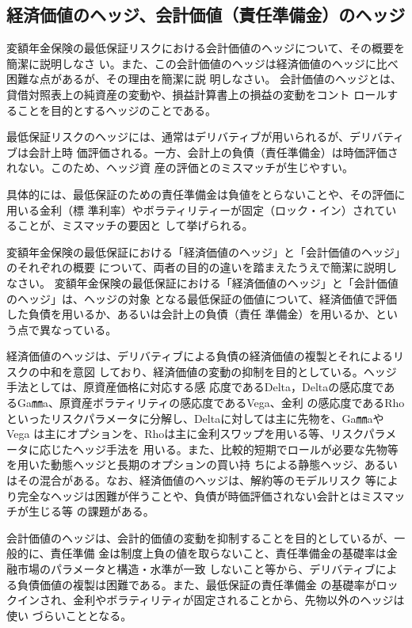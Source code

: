 \documentclass[report,gutter=10mm,fore-edge=10mm,uplatex,dvipdfmx]{jlreq}
\begin{document}
{\subsection{経済価値のヘッジ、会計価値（責任準備金）のヘッジ}
変額年金保険の最低保証リスクにおける会計価値のヘッジについて、その概要を簡潔に説明しなさ
い。また、この会計価値のヘッジは経済価値のヘッジに比べ困難な点があるが、その理由を簡潔に説
明しなさい。
\answer{}
会計価値のヘッジとは、貸借対照表上の純資産の変動や、損益計算書上の損益の変動をコント
ロールすることを目的とするヘッジのことである。

最低保証リスクのヘッジには、通常はデリバティブが用いられるが、デリバティブは会計上時
価評価される。一方、会計上の負債（責任準備金）は時価評価されない。このため、ヘッジ資
産の評価とのミスマッチが生じやすい。

具体的には、最低保証のための責任準備金は負値をとらないことや、その評価に用いる金利（標
準利率）やボラティリティーが固定（ロック・イン）されていることが、ミスマッチの要因と
して挙げられる。

変額年金保険の最低保証における「経済価値のヘッジ」と「会計価値のヘッジ」のそれぞれの概要
について、両者の目的の違いを踏まえたうえで簡潔に説明しなさい。
\answer{}
変額年金保険の最低保証における「経済価値のヘッジ」と「会計価値のヘッジ」は、ヘッジの対象
となる最低保証の価値について、経済価値で評価した負債を用いるか、あるいは会計上の負債（責任
準備金）を用いるか、という点で異なっている。

経済価値のヘッジは、デリバティブによる負債の経済価値の複製とそれによるリスクの中和を意図
しており、経済価値の変動の抑制を目的としている。ヘッジ手法としては、原資産価格に対応する感
応度であるDelta，Deltaの感応度であるGa㎜a、原資産ボラティリティの感応度であるVega、金利
の感応度であるRhoといったリスクパラメータに分解し、Deltaに対しては主に先物を、Ga㎜aやVega
は主にオプションを、Rhoは主に金利スワップを用いる等、リスクパラメータに応じたヘッジ手法を
用いる。また、比較的短期でロールが必要な先物等を用いた動態ヘッジと長期のオプションの買い持
ちによる静態ヘッジ、あるいはその混合がある。なお、経済価値のヘッジは、解約等のモデルリスク
等により完全なヘッジは困難が伴うことや、負債が時価評価されない会計とはミスマッチが生じる等
の課題がある。

会計価値のヘッジは、会計的価値の変動を抑制することを目的としているが、一般的に、責任準備
金は制度上負の値を取らないこと、責任準備金の基礎率は金融市場のパラメータと構造・水準が一致
しないこと等から、デリバティブによる負債価値の複製は困難である。また、最低保証の責任準備金
の基礎率がロックインされ、金利やボラティリティが固定されることから、先物以外のヘッジは使い
づらいこととなる。

}
\end{document}
